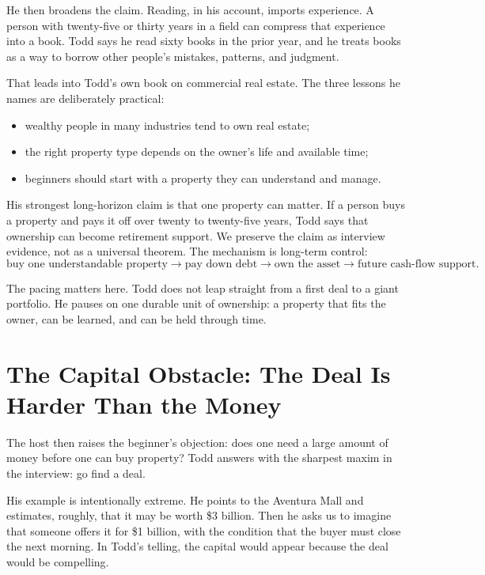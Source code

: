 He then broadens the claim. Reading, in his account, imports experience. A person with twenty-five or thirty years in a field can compress that experience into a book. Todd says he read sixty books in the prior year, and he treats books as a way to borrow other people's mistakes, patterns, and judgment.

That leads into Todd's own book on commercial real estate. The three lessons he names are deliberately practical:
\begin{itemize}
\item wealthy people in many industries tend to own real estate;
\item the right property type depends on the owner's life and available time;
\item beginners should start with a property they can understand and manage.
\end{itemize}

His strongest long-horizon claim is that one property can matter. If a person buys a property and pays it off over twenty to twenty-five years, Todd says that ownership can become retirement support. We preserve the claim as interview evidence, not as a universal theorem. The mechanism is long-term control:
\begin{equation}
\text{buy one understandable property}
\longrightarrow
\text{pay down debt}
\longrightarrow
\text{own the asset}
\longrightarrow
\text{future cash-flow support}.
\end{equation}

The pacing matters here. Todd does not leap straight from a first deal to a giant portfolio. He pauses on one durable unit of ownership: a property that fits the owner, can be learned, and can be held through time.

\section{The Capital Obstacle: The Deal Is Harder Than the Money}

The host then raises the beginner's objection: does one need a large amount of money before one can buy property? Todd answers with the sharpest maxim in the interview: go find a deal.

His example is intentionally extreme. He points to the Aventura Mall and estimates, roughly, that it may be worth \$3 billion. Then he asks us to imagine that someone offers it for \$1 billion, with the condition that the buyer must close the next morning. In Todd's telling, the capital would appear because the deal would be compelling.

